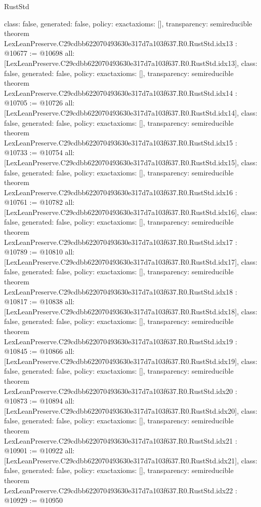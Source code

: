 \begin{lexlean}{RustStd}
\begin{coremodule}
{  class: false,
  generated: false,
  policy: exact{axioms: []},
  transparency: semireducible
}
theorem LexLeanPreserve.C29cdbb622070493630e317d7a103f637.R0.RustStd.idx13 : @10677 := @10698 {
  all: [LexLeanPreserve.C29cdbb622070493630e317d7a103f637.R0.RustStd.idx13],
  class: false,
  generated: false,
  policy: exact{axioms: []},
  transparency: semireducible
}
theorem LexLeanPreserve.C29cdbb622070493630e317d7a103f637.R0.RustStd.idx14 : @10705 := @10726 {
  all: [LexLeanPreserve.C29cdbb622070493630e317d7a103f637.R0.RustStd.idx14],
  class: false,
  generated: false,
  policy: exact{axioms: []},
  transparency: semireducible
}
theorem LexLeanPreserve.C29cdbb622070493630e317d7a103f637.R0.RustStd.idx15 : @10733 := @10754 {
  all: [LexLeanPreserve.C29cdbb622070493630e317d7a103f637.R0.RustStd.idx15],
  class: false,
  generated: false,
  policy: exact{axioms: []},
  transparency: semireducible
}
theorem LexLeanPreserve.C29cdbb622070493630e317d7a103f637.R0.RustStd.idx16 : @10761 := @10782 {
  all: [LexLeanPreserve.C29cdbb622070493630e317d7a103f637.R0.RustStd.idx16],
  class: false,
  generated: false,
  policy: exact{axioms: []},
  transparency: semireducible
}
theorem LexLeanPreserve.C29cdbb622070493630e317d7a103f637.R0.RustStd.idx17 : @10789 := @10810 {
  all: [LexLeanPreserve.C29cdbb622070493630e317d7a103f637.R0.RustStd.idx17],
  class: false,
  generated: false,
  policy: exact{axioms: []},
  transparency: semireducible
}
theorem LexLeanPreserve.C29cdbb622070493630e317d7a103f637.R0.RustStd.idx18 : @10817 := @10838 {
  all: [LexLeanPreserve.C29cdbb622070493630e317d7a103f637.R0.RustStd.idx18],
  class: false,
  generated: false,
  policy: exact{axioms: []},
  transparency: semireducible
}
theorem LexLeanPreserve.C29cdbb622070493630e317d7a103f637.R0.RustStd.idx19 : @10845 := @10866 {
  all: [LexLeanPreserve.C29cdbb622070493630e317d7a103f637.R0.RustStd.idx19],
  class: false,
  generated: false,
  policy: exact{axioms: []},
  transparency: semireducible
}
theorem LexLeanPreserve.C29cdbb622070493630e317d7a103f637.R0.RustStd.idx20 : @10873 := @10894 {
  all: [LexLeanPreserve.C29cdbb622070493630e317d7a103f637.R0.RustStd.idx20],
  class: false,
  generated: false,
  policy: exact{axioms: []},
  transparency: semireducible
}
theorem LexLeanPreserve.C29cdbb622070493630e317d7a103f637.R0.RustStd.idx21 : @10901 := @10922 {
  all: [LexLeanPreserve.C29cdbb622070493630e317d7a103f637.R0.RustStd.idx21],
  class: false,
  generated: false,
  policy: exact{axioms: []},
  transparency: semireducible
}
theorem LexLeanPreserve.C29cdbb622070493630e317d7a103f637.R0.RustStd.idx22 : @10929 := @10950 {
}
\end{coremodule}
\end{lexlean}
